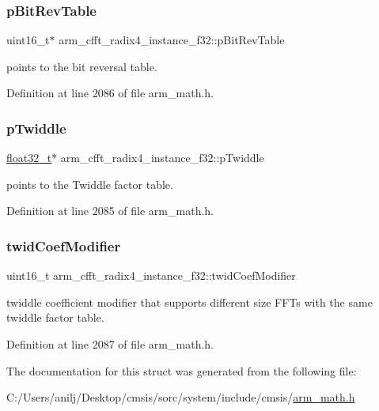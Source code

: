 \subsubsection{\texorpdfstring{p\+Bit\+Rev\+Table}{pBitRevTable}}
{\footnotesize\ttfamily uint16\+\_\+t$\ast$ arm\+\_\+cfft\+\_\+radix4\+\_\+instance\+\_\+f32\+::p\+Bit\+Rev\+Table}

points to the bit reversal table. 

Definition at line 2086 of file arm\+\_\+math.\+h.

\mbox{\label{structarm__cfft__radix4__instance__f32_a14860c7544911702ca1fa0bf78204ef3}} 
\subsubsection{\texorpdfstring{p\+Twiddle}{pTwiddle}}
{\footnotesize\ttfamily \hyperlink{arm__math_8h_a4611b605e45ab401f02cab15c5e38715}{float32\+\_\+t}$\ast$ arm\+\_\+cfft\+\_\+radix4\+\_\+instance\+\_\+f32\+::p\+Twiddle}

points to the Twiddle factor table. 

Definition at line 2085 of file arm\+\_\+math.\+h.

\mbox{\label{structarm__cfft__radix4__instance__f32_abe31ea2157dfa233e389cdfd3b9993ee}} 
\subsubsection{\texorpdfstring{twid\+Coef\+Modifier}{twidCoefModifier}}
{\footnotesize\ttfamily uint16\+\_\+t arm\+\_\+cfft\+\_\+radix4\+\_\+instance\+\_\+f32\+::twid\+Coef\+Modifier}

twiddle coefficient modifier that supports different size F\+F\+Ts with the same twiddle factor table. 

Definition at line 2087 of file arm\+\_\+math.\+h.



The documentation for this struct was generated from the following file\+:\begin{DoxyCompactItemize}
\item 
C\+:/\+Users/anilj/\+Desktop/cmsis/sorc/system/include/cmsis/\hyperlink{arm__math_8h}{arm\+\_\+math.\+h}\end{DoxyCompactItemize}
